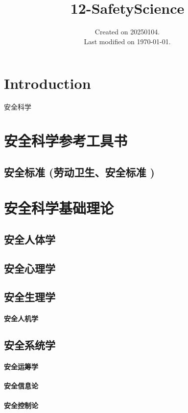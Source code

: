 \documentclass[UTF8]{../ApplicationUniverse}
\begin{document}
\title{12-SafetyScience}
\date{Created on 20250104.\\   Last modified on \today.}
\maketitle
\tableofcontents


\chapter{Introduction}


安全科学


\chapter{安全科学参考工具书}
\section{安全标准 (劳动卫生、安全标准 )}


\chapter{安全科学基础理论}
\section{安全人体学}
\section{安全心理学}
\section{安全生理学}
    \subsubsection{安全人机学}
\section{安全系统学}
    \subsubsection{安全运筹学}
    \subsubsection{安全信息论}
    \subsubsection{安全控制论}
\end{document}
